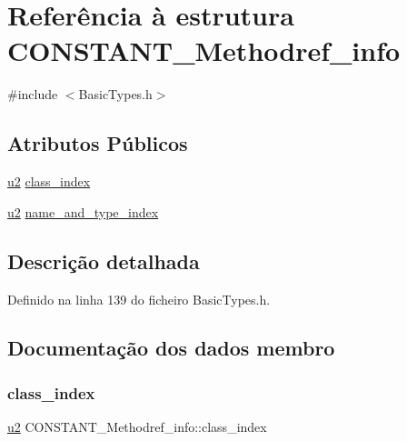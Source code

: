 \hypertarget{structCONSTANT__Methodref__info}{}\section{Referência à estrutura C\+O\+N\+S\+T\+A\+N\+T\+\_\+\+Methodref\+\_\+info}
\label{structCONSTANT__Methodref__info}


{\ttfamily \#include $<$Basic\+Types.\+h$>$}

\subsection*{Atributos Públicos}
\begin{DoxyCompactItemize}
\item 
\hyperlink{BasicTypes_8h_a732cde1300aafb73b0ea6c2558a7a54f}{u2} \hyperlink{structCONSTANT__Methodref__info_ac625db7f532b350843d6cb88c3fbde0c}{class\+\_\+index}
\item 
\hyperlink{BasicTypes_8h_a732cde1300aafb73b0ea6c2558a7a54f}{u2} \hyperlink{structCONSTANT__Methodref__info_aa5933f9d2469d4be22a19960bb25da5e}{name\+\_\+and\+\_\+type\+\_\+index}
\end{DoxyCompactItemize}


\subsection{Descrição detalhada}


Definido na linha 139 do ficheiro Basic\+Types.\+h.



\subsection{Documentação dos dados membro}
\mbox{\label{structCONSTANT__Methodref__info_ac625db7f532b350843d6cb88c3fbde0c}} 
\subsubsection{\texorpdfstring{class\+\_\+index}{class\_index}}
{\footnotesize\ttfamily \hyperlink{BasicTypes_8h_a732cde1300aafb73b0ea6c2558a7a54f}{u2} C\+O\+N\+S\+T\+A\+N\+T\+\_\+\+Methodref\+\_\+info\+::class\+\_\+index}



